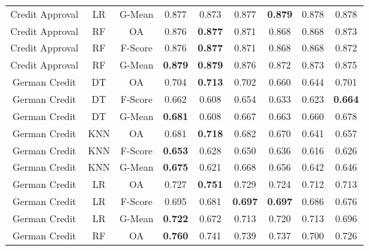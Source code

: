 \begin{longtable}{ccccccccc}
   Credit Approval &         LR &  G-Mean &          0.877 &          0.873 &          0.877 & \textbf{0.879} &          0.878 &          0.878 \\
   Credit Approval &         RF &      OA &          0.876 & \textbf{0.877} &          0.871 &          0.868 &          0.868 &          0.873 \\
   Credit Approval &         RF & F-Score &          0.876 & \textbf{0.877} &          0.871 &          0.868 &          0.868 &          0.872 \\
   Credit Approval &         RF &  G-Mean & \textbf{0.879} & \textbf{0.879} &          0.876 &          0.872 &          0.873 &          0.875 \\
     German Credit &         DT &      OA &          0.704 & \textbf{0.713} &          0.702 &          0.660 &          0.644 &          0.701 \\
     German Credit &         DT & F-Score &          0.662 &          0.608 &          0.654 &          0.633 &          0.623 & \textbf{0.664} \\
     German Credit &         DT &  G-Mean & \textbf{0.681} &          0.608 &          0.667 &          0.663 &          0.660 &          0.678 \\
     German Credit &        KNN &      OA &          0.681 & \textbf{0.718} &          0.682 &          0.670 &          0.641 &          0.657 \\
     German Credit &        KNN & F-Score & \textbf{0.653} &          0.628 &          0.650 &          0.636 &          0.616 &          0.626 \\
     German Credit &        KNN &  G-Mean & \textbf{0.675} &          0.621 &          0.668 &          0.656 &          0.642 &          0.646 \\
     German Credit &         LR &      OA &          0.727 & \textbf{0.751} &          0.729 &          0.724 &          0.712 &          0.713 \\
     German Credit &         LR & F-Score &          0.695 &          0.681 & \textbf{0.697} & \textbf{0.697} &          0.686 &          0.676 \\
     German Credit &         LR &  G-Mean & \textbf{0.722} &          0.672 &          0.713 &          0.720 &          0.713 &          0.696 \\
     German Credit &         RF &      OA & \textbf{0.760} &          0.741 &          0.739 &          0.737 &          0.700 &          0.726 \\

\end{longtable}
